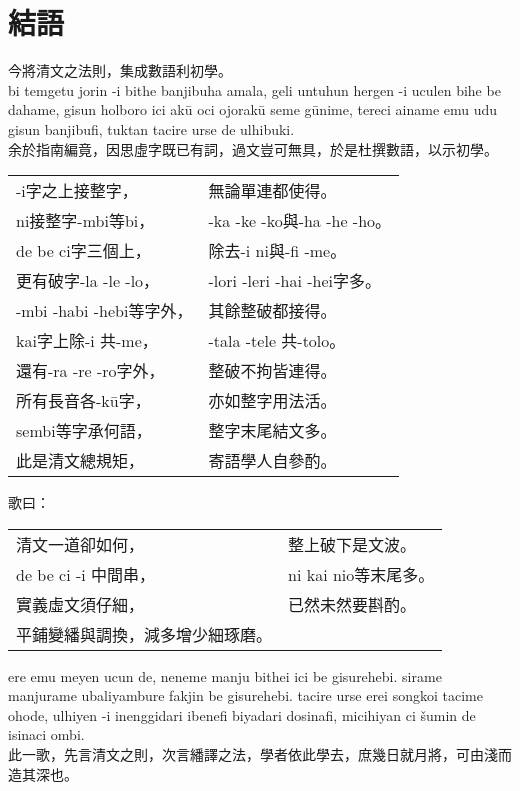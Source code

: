 \documentclass{article}
\begin{document}
\section{結語}
\noindent 今將清文之法則，集成數語利初學。\\
\noindent bi temgetu jorin -i bithe banjibuha amala, geli untuhun hergen -i uculen bihe be dahame, gisun holboro ici ak\={u} oci ojorak\={u} seme g\={u}nime, tereci ainame emu udu gisun banjibufi, tuktan tacire urse de ulhibuki.\\
\noindent 余於指南編竟，因思虛字既已有詞，過文豈可無具，於是杜撰數語，以示初學。
\begin{center}
    \begin{tabularx}{\textwidth}{XX}
        -i字之上接整字，&無論單連都使得。\\
        ni接整字-mbi等bi，&-ka -ke -ko與-ha -he -ho。\\
        de be ci字三個上，&除去-i ni與-fi -me。\\
        更有破字-la -le -lo，&-lori -leri -hai -hei字多。\\
        -mbi -habi -hebi等字外，&其餘整破都接得。\\
        kai字上除-i 共-me，&-tala -tele 共-tolo。\\
        還有-ra -re -ro字外，&整破不拘皆連得。\\
        所有長音各-k\={u}字，&亦如整字用法活。\\
        sembi等字承何語，&整字末尾結文多。\\
        此是清文總規矩，&寄語學人自參酌。\\
    \end{tabularx}
\end{center}
\noindent 歌曰：
\begin{center}
    \begin{tabularx}{\textwidth}{XX}
        清文一道卻如何，&整上破下是文波。\\
        de be ci -i 中間串，&ni kai nio等末尾多。\\
        實義虛文須仔細，&已然未然要斟酌。\\
        平鋪變繙與調換，減多增少細琢磨。
    \end{tabularx}
\end{center}
\noindent ere emu meyen ucun de, neneme manju bithei ici be gisurehebi. sirame manjurame ubaliyambure fakjin be gisurehebi. tacire urse erei songkoi tacime ohode, ulhiyen -i inenggidari ibenefi biyadari dosinafi, micihiyan ci \v{s}umin de isinaci ombi. \\
\noindent 此一歌，先言清文之則，次言繙譯之法，學者依此學去，庶幾日就月將，可由淺而造其深也。
\end{document}
